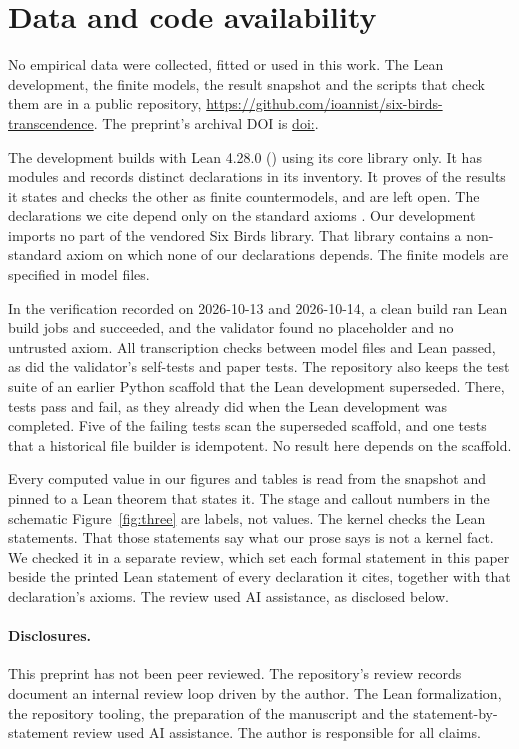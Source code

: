\section*{Data and code availability}
\label{sec:availability}

No empirical data were collected, fitted or used in this work. The Lean
development, the finite models, the result snapshot and the scripts that check
them are in a public repository,
\url{https://github.com/ioannist/six-birds-transcendence}. The preprint's
archival DOI is \href{https://doi.org/\paperdoi}{doi:\paperdoi}.

The development builds with Lean 4.28.0 (\relLeanToolchain) using its core
library only. It has \relCstttModules{} modules and records
\relUniqueInventoryDeclarations{} distinct declarations in its inventory. It
proves \relProvedRows{} of the \relRegistryRows{} results it states and checks
the other \relCheckedCountermodels{} as finite countermodels, and
\relOpenRows{} are left open. The \relHeadlineDeclarations{} declarations we
cite depend only on the standard axioms \relHeadlineAxioms{}. Our
development imports no part of the vendored Six Birds library. That library
contains a non-standard axiom on which none of our declarations depends. The
finite models are specified in \relModelSpecs{} model files.

In the verification recorded on 2026-10-13 and 2026-10-14, a clean build ran \relLeanBuildJobs{} Lean
build jobs and succeeded, and the validator found no placeholder and no
untrusted axiom. All transcription checks between model files and Lean passed,
as did the validator's \relSelftestValidateLeanTestsPassed{} self-tests and
\relPaperTestsPassed{} paper tests. The repository also keeps the test suite of
an earlier Python scaffold that the Lean development superseded. There,
\relCstTtTestsPassed{} tests pass and \relCstTtTestsFailed{} fail, as they
already did when the Lean development was completed. Five of the failing
tests scan the superseded scaffold, and one tests that a historical file
builder is idempotent. No result here depends on the scaffold.

Every computed value in our figures and tables is read from the snapshot and
pinned to a Lean theorem that states it. The stage and callout numbers in the
schematic Figure~\ref{fig:three} are labels, not values. The kernel checks the Lean statements. That
those statements say what our prose says is not a kernel fact. We checked it in
a separate review, which set each formal statement in this paper beside the
printed Lean statement of every declaration it cites, together with that
declaration's axioms. The review used AI assistance, as disclosed below.

\paragraph{Disclosures.}
This preprint has not been peer reviewed. The repository's review records
document an internal review loop driven by the author. The Lean
formalization, the repository tooling, the preparation of the manuscript and
the statement-by-statement review used AI assistance. The author is responsible
for all claims.
